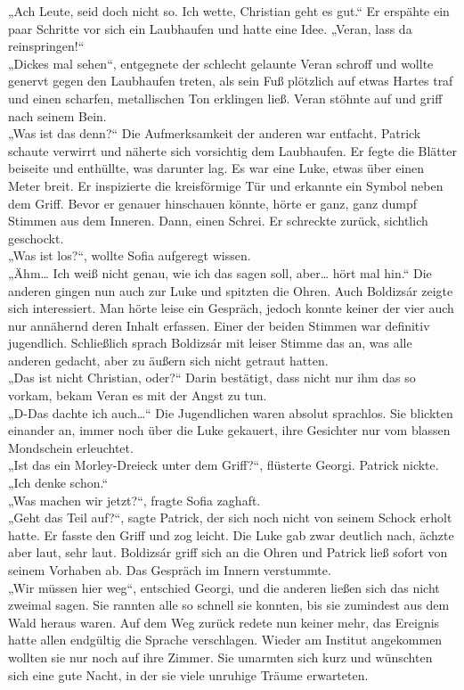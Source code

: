 \documentclass[oneside]{memoir}
\begin{document}
„Ach Leute, seid doch nicht so. Ich wette, Christian geht es gut.“
Er erspähte ein paar Schritte vor sich ein Laubhaufen und hatte eine Idee.
„Veran, lass da reinspringen!“ \\
„Dickes mal sehen“, entgegnete der schlecht gelaunte Veran schroff und wollte genervt gegen den Laubhaufen treten, als sein Fuß plötzlich auf etwas Hartes traf und einen scharfen, metallischen Ton erklingen ließ.
Veran stöhnte auf und griff nach seinem Bein.  \\
„Was ist das denn?“
Die Aufmerksamkeit der anderen war entfacht. Patrick schaute verwirrt und näherte sich vorsichtig dem Laubhaufen. Er fegte die Blätter beiseite und enthüllte, was darunter lag. Es war eine Luke, etwas über einen Meter breit. Er inspizierte die kreisförmige Tür und erkannte ein Symbol neben dem Griff. Bevor er genauer hinschauen könnte, hörte er ganz, ganz dumpf Stimmen aus dem Inneren. Dann, einen Schrei. Er schreckte zurück, sichtlich geschockt. \\
„Was ist los?“, wollte Sofia aufgeregt wissen. \\
„Ähm… Ich weiß nicht genau, wie ich das sagen soll, aber… hört mal hin.“
Die anderen gingen nun auch zur Luke und spitzten die Ohren. Auch Boldizsár zeigte sich interessiert.
Man hörte leise ein Gespräch, jedoch konnte keiner der vier auch nur annähernd deren Inhalt erfassen. Einer der beiden Stimmen war definitiv jugendlich. Schließlich sprach Boldizsár mit leiser Stimme das an, was alle anderen gedacht, aber zu äußern sich nicht getraut hatten. \\
„Das ist nicht Christian, oder?“
Darin bestätigt, dass nicht nur ihm das so vorkam, bekam Veran es mit der Angst zu tun. \\
„D-Das dachte ich auch…“
Die Jugendlichen waren absolut sprachlos. Sie blickten einander an, immer noch über die Luke gekauert, ihre Gesichter nur vom blassen Mondschein erleuchtet. \\
„Ist das ein Morley-Dreieck unter dem Griff?“, flüsterte Georgi. Patrick nickte. \\
„Ich denke schon.“ \\
„Was machen wir jetzt?“, fragte Sofia zaghaft. \\
„Geht das Teil auf?“, sagte Patrick, der sich noch nicht von seinem Schock erholt hatte. Er fasste den Griff und zog leicht. Die Luke gab zwar deutlich nach, ächzte aber laut, sehr laut. Boldizsár griff sich an die Ohren und Patrick ließ sofort von seinem Vorhaben ab. Das Gespräch im Innern verstummte.  \\
„Wir müssen hier weg“, entschied Georgi, und die anderen ließen sich das nicht zweimal sagen. Sie rannten alle so schnell sie konnten, bis sie zumindest aus dem Wald heraus waren.
Auf dem Weg zurück redete nun keiner mehr, das Ereignis hatte allen endgültig die Sprache verschlagen. Wieder am Institut angekommen wollten sie nur noch auf ihre Zimmer. Sie umarmten sich kurz und wünschten sich eine gute Nacht, in der sie viele unruhige Träume erwarteten.
\end{document}
